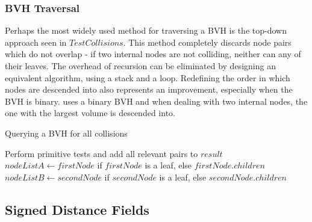 \subsubsection{BVH Traversal}
\label{sub-sub-sec:traversal}

Perhaps the most widely used method for traversing a BVH is the top-down approach seen in \hyperref[alg:BVHQuery]{$TestCollisions$}. This method completely discards node pairs which do not overlap - if two internal nodes are not colliding, neither can any of their leaves. The overhead of recursion can be eliminated by designing an equivalent algorithm, using a stack and a loop. Redefining the order in which nodes are descended into also represents an improvement, especially when the BVH is binary. \citep{vdb97} uses a binary BVH and when dealing with two internal nodes, the one with the largest volume is descended into.

\begin{algorithm}
	\label{alg:BVHQuery}
	\caption{Querying a BVH for all collisions}
	\begin{algorithmic}[1]
				\State Perform primitive tests and add all relevant pairs to $result$		
			\Else
				\State $nodeListA \gets firstNode$ if $firstNode$ is a leaf, else $firstNode.children$
				\State $nodeListB \gets secondNode$ if $secondNode$ is a leaf, else $secondNode.children$
					\State {}
				\EndFor
			\EndIf
		\EndIf
		\EndProcedure
	\end{algorithmic}
\end{algorithm}


\FloatBarrier
\subsection{Signed Distance Fields}
\label{sub-sec:sdf}


